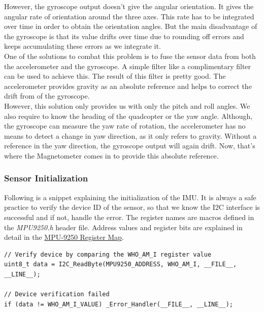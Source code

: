 \documentclass[a4paper,12pt,oneside]{book}
\begin{document}
However, the gyroscope output doesn't give the angular orientation. It gives the angular rate of orientation around the three axes. This rate has to be integrated over time in order to obtain the orientation angles. But the main disadvantage of the gyroscope is that its value drifts over time due to rounding off errors and keeps accumulating these errors as we integrate it.\\

One of the solutions to combat this problem is to fuse the sensor data from both the accelerometer and the gyroscope. A simple filter like a complimentary filter can be used to achieve this. The result of this filter is pretty good. The accelerometer provides gravity as an absolute reference and helps to correct the drift from of the gyroscope.\\ 

However, this solution only provides us with only the pitch and roll angles. We also require to know the heading of the quadcopter or the yaw angle. Although, the gyroscope can measure the yaw rate of rotation, the accelerometer has no means to detect a change in yaw direction, as it only refers to gravity. Without a reference in the yaw direction, the gyroscope output will again drift. Now, that's where the Magnetometer comes in to provide this absolute reference.\\

\clearpage

\subsubsection{Sensor Initialization}
Following is a snippet explaining the initialization of the IMU. It is always a safe practice to verify the device ID of the sensor, so that we know the I2C interface is successful and if not, handle the error. The register names are macros defined in the \textit{MPU9250.h} header file. Address values and register bits are explained in detail in the \href{./datasheets/MPU9250 Register Map.pdf}{MPU-9250 Register Map}.\\  

\begin{verbatim}
// Verify device by comparing the WHO_AM_I register value
uint8_t data = I2C_ReadByte(MPU9250_ADDRESS, WHO_AM_I, __FILE__, __LINE__);
 
// Device verification failed 
if (data != WHO_AM_I_VALUE) _Error_Handler(__FILE__, __LINE__);
\end{verbatim}
\end{document}
